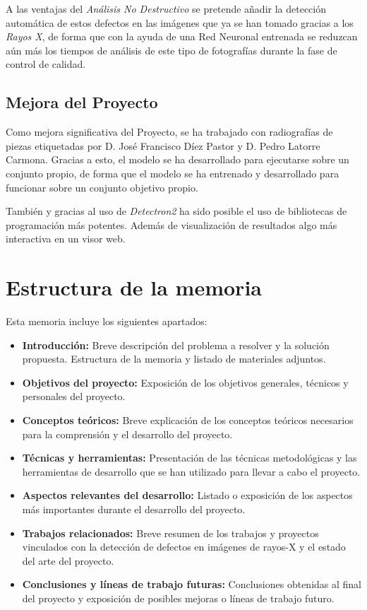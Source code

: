 A las ventajas del \emph{Análisis No Destructivo} se pretende añadir la detección automática de estos defectos en las imágenes que ya se han tomado gracias a los \emph{Rayos X}, de forma que con la ayuda de una Red Neuronal entrenada se reduzcan aún más los tiempos de análisis de este tipo de fotografías durante la fase de control de calidad.

\subsection{Mejora del Proyecto}
Como mejora significativa del Proyecto, se ha trabajado con radiografías de piezas etiquetadas por D. José Francisco Díez Pastor y D. Pedro Latorre Carmona. Gracias a esto, el modelo se ha desarrollado para ejecutarse sobre un conjunto propio, de forma que el modelo se ha entrenado y desarrollado para funcionar sobre un conjunto objetivo propio.

También y gracias al uso de \emph{Detectron2} ha sido posible el uso de bibliotecas de programación más potentes.
Además de visualización de resultados algo más interactiva en un visor web.

\section{Estructura de la memoria}

Esta memoria incluye los siguientes apartados:

\begin{itemize}
    \item \textbf{Introducción:} Breve descripción del problema a resolver y la solución propuesta. Estructura de la memoria y listado de materiales adjuntos.
    \item \textbf{Objetivos del proyecto:} Exposición de los    objetivos generales, técnicos y personales del proyecto.
    \item \textbf{Conceptos teóricos:} Breve explicación de los conceptos teóricos necesarios para la comprensión y el desarrollo del proyecto.
    \item \textbf{Técnicas y herramientas:} Presentación de las técnicas metodológicas y las herramientas de desarrollo que se han utilizado para llevar a cabo el proyecto.
    \item \textbf{Aspectos relevantes del desarrollo:} Listado o exposición de los aspectos más importantes durante el desarrollo del proyecto.
    \item \textbf{Trabajos relacionados:} Breve resumen de los trabajos y proyectos vinculados con la detección de defectos en imágenes de rayos-X y el estado del arte del proyecto.
    \item \textbf{Conclusiones y líneas de trabajo futuras:} Conclusiones obtenidas al final del proyecto y exposición de posibles mejoras o líneas de trabajo futuro.
\end{itemize}
    
